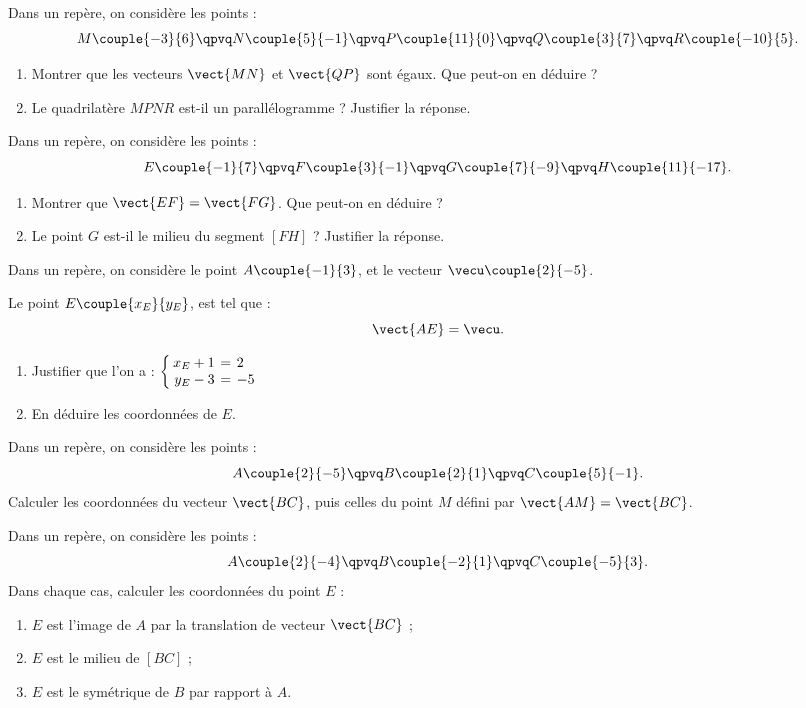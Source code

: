\exo

Dans un repère, on considère les points :
\[
M\couple{-3}{6}
\qpvq
N\couple{5}{-1}
\qpvq
P\couple{11}{0}
\qpvq
Q\couple{3}{7}
\qpvq
R\couple{-10}{5}.
\]
\begin{enumerate}
\item Montrer que les vecteurs $\vect{MN}$ et $\vect{QP}$ sont égaux. Que peut-on en déduire ?
\item Le quadrilatère $MPNR$ est-il un parallélogramme ? Justifier la réponse.
\end{enumerate}

\exo

Dans un repère, on considère les points :
\[
E\couple{-1}{7}
\qpvq
F\couple{3}{-1}
\qpvq
G\couple{7}{-9}
\qpvq
H\couple{11}{-17}.
\]
\begin{enumerate}
\item Montrer que $\vect{EF}=\vect{FG}$. Que peut-on en déduire ?
\item Le point $G$ est-il le milieu du segment $[FH]$ ? Justifier la réponse.
\end{enumerate}

\exo

Dans un repère, on considère le point $A\couple{-1}{3}$, et le vecteur $\vecu\couple{2}{-5}$.

Le point $E\couple{x_E}{y_E}$, est tel que :
\[\vect{AE}=\vecu.\]
\begin{enumerate}
\item Justifier que l'on a : $\left\{\setlength\arraycolsep{2pt}\begin{array}{rcl}
x_E+1 & = & 2 \\
y_E-3 & = & -5
\end{array}\right.$
\item En déduire les coordonnées de $E$.
\end{enumerate}

\exo

Dans un repère, on considère les points :
\[
A\couple{2}{-5}
\qpvq
B\couple{2}{1}
\qpvq
C\couple{5}{-1}.
\]
Calculer les coordonnées du vecteur $\vect{BC}$, puis celles du point $M$ défini par $\vect{AM}=\vect{BC}$.

\exo

Dans un repère, on considère les points :
\[
A\couple{2}{-4}
\qpvq
B\couple{-2}{1}
\qpvq
C\couple{-5}{3}.
\]
Dans chaque cas, calculer les coordonnées du point $E$ :
\begin{enumerate}
\item $E$ est l'image de $A$ par la translation de vecteur $\vect{BC}$ ;
\item $E$ est le milieu de $[BC]$ ;
\item $E$ est le symétrique de $B$ par rapport à $A$.
\end{enumerate}

